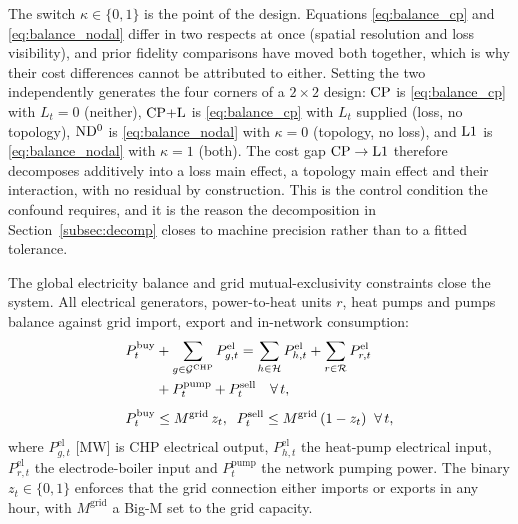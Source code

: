 The switch $\kappa \in \{0,1\}$ is the point of the design. Equations
\eqref{eq:balance_cp} and \eqref{eq:balance_nodal} differ in two respects at once
(spatial resolution and loss visibility), and prior fidelity comparisons have moved both
together, which is why their cost differences cannot be attributed to either. Setting the
two independently generates the four corners of a $2\times2$ design: $\mathrm{CP}$ is
\eqref{eq:balance_cp} with $L_t = 0$ (neither), $\mathrm{CP{+}L}$ is \eqref{eq:balance_cp} with
$L_t$ supplied (loss, no topology), $\mathrm{ND^{0}}$ is \eqref{eq:balance_nodal} with $\kappa = 0$
(topology, no loss), and $\mathrm{L1}$ is \eqref{eq:balance_nodal} with $\kappa = 1$ (both).
The cost gap $\mathrm{CP} \to \mathrm{L1}$ therefore decomposes additively into a loss main effect, a
topology main effect and their interaction, with no residual by construction. This is the
control condition the confound requires, and it is the reason the decomposition in
Section~\ref{subsec:decomp} closes to machine precision rather than to a fitted
tolerance.

The global electricity balance and grid mutual-exclusivity constraints close the system.
All electrical generators, power-to-heat units $r$, heat pumps and pumps balance against
grid import, export and in-network consumption:
\begin{align}
  P_t^{\mathrm{buy}}
    &+ \sum_{g \in \mathcal{G}^{\mathrm{CHP}}} P_{g,t}^{\mathrm{el}}
  = \sum_{h \in \mathcal{H}} P_{h,t}^{\mathrm{el}}
    + \sum_{r \in \mathcal{R}} P_{r,t}^{\mathrm{el}} \notag \\
    &+ P_t^{\mathrm{pump}} + P_t^{\mathrm{sell}}
  \quad \forall\, t,
  \label{eq:balance_el} \\[4pt]
  P_t^{\mathrm{buy}} &\leq M^{\mathrm{grid}}\, z_t,
  \;\;
  P_t^{\mathrm{sell}} \leq M^{\mathrm{grid}}\, (1 - z_t)
  \;\; \forall\, t,
  \label{eq:grid_bigm}
\end{align}
where $P_{g,t}^{\mathrm{el}}$ [MW] is CHP electrical output, $P_{h,t}^{\mathrm{el}}$ the
heat-pump electrical input, $P_{r,t}^{\mathrm{el}}$ the electrode-boiler input and
$P_t^{\mathrm{pump}}$ the network pumping power. The binary $z_t \in \{0,1\}$ enforces
that the grid connection either imports or exports in any hour, with $M^{\mathrm{grid}}$
a Big-M set to the grid capacity.

